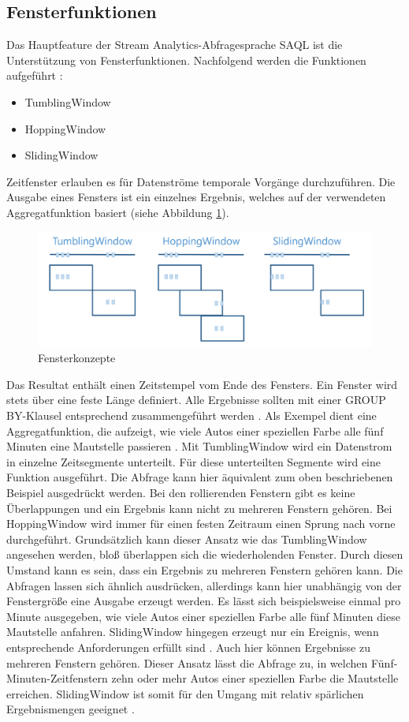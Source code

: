 \subsection{Fensterfunktionen}
Das Hauptfeature der Stream Analytics-Abfragesprache SAQL ist die Unterstützung von Fensterfunktionen. Nachfolgend werden die Funktionen aufgeführt \cite{Prosise.}: 
\begin{itemize} 
	\item TumblingWindow
	\item HoppingWindow
	\item SlidingWindow
\end{itemize}
Zeitfenster erlauben es für Datenströme temporale Vorgänge durchzuführen. Die Ausgabe eines Fensters ist ein einzelnes Ergebnis, welches auf der verwendeten Aggregatfunktion basiert (siehe Abbildung \ref{fig:window_concepts}). 
\begin{figure}[H]
	\centering
	\includegraphics[width=1.0\linewidth]{images/fensterfunktionen}
	\caption{Fensterkonzepte \cite{Prosise.}} %
	\label{fig:window_concepts}
\end{figure} 
Das Resultat enthält einen Zeitstempel vom Ende des Fensters. Ein Fenster wird stets über eine feste Länge definiert. Alle Ergebnisse sollten mit einer GROUP BY-Klausel entsprechend zusammengeführt werden \cite{Azure.2017}. 
Als Exempel dient eine Aggregatfunktion, die aufzeigt, wie viele Autos einer speziellen Farbe alle fünf Minuten eine Mautstelle passieren \cite{Prosise.}. Mit TumblingWindow wird ein Datenstrom in einzelne Zeitsegmente unterteilt. Für diese unterteilten Segmente wird eine Funktion ausgeführt. Die Abfrage kann hier äquivalent zum oben beschriebenen Beispiel ausgedrückt werden. Bei den rollierenden Fenstern gibt es keine Überlappungen und ein Ergebnis kann nicht zu mehreren Fenstern gehören. Bei HoppingWindow wird immer für einen festen Zeitraum einen Sprung nach vorne durchgeführt. Grundsätzlich kann dieser Ansatz wie das TumblingWindow angesehen werden, bloß überlappen sich die wiederholenden Fenster. Durch diesen Umstand kann es sein, dass ein Ergebnis zu mehreren Fenstern gehören kann. Die Abfragen lassen sich ähnlich ausdrücken, allerdings kann hier unabhängig von der Fenstergröße eine Ausgabe erzeugt werden. Es lässt sich beispielsweise einmal pro Minute ausgegeben, wie viele Autos einer speziellen Farbe alle fünf Minuten diese Mautstelle anfahren. SlidingWindow hingegen erzeugt nur ein Ereignis, wenn entsprechende Anforderungen erfüllt sind \cite{Azure.2017}. Auch hier können Ergebnisse zu mehreren Fenstern gehören. Dieser Ansatz lässt die Abfrage zu, in welchen Fünf-Minuten-Zeitfenstern zehn oder mehr Autos einer speziellen Farbe die Mautstelle erreichen. SlidingWindow ist somit für den Umgang mit relativ spärlichen Ergebnismengen geeignet \cite{Prosise.}.

 